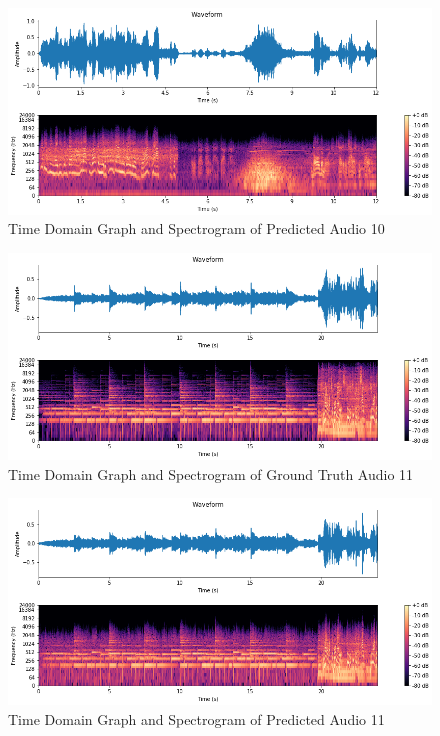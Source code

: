 \documentclass{ioereport}
\begin{document}
    \begin{figure}[H]
        \centering
        \includegraphics[width=\linewidth]{assets/audio_results/12secondspred.png}
        \caption{Time Domain Graph and Spectrogram of Predicted Audio 10}
        \label{fig:pred-12s-spec}
    \end{figure}

    \begin{figure}[H]
        \centering
        \includegraphics[width=\linewidth]{assets/audio_results/24seconds.png}
        \caption{Time Domain Graph and Spectrogram of Ground Truth Audio 11}
        \label{fig:gt-24s-spec}
    \end{figure}
    
    \begin{figure}[H]
        \centering
        \includegraphics[width=\linewidth]{assets/audio_results/24secondspred.png}
        \caption{Time Domain Graph and Spectrogram of Predicted Audio 11}
        \label{fig:pred-24s-spec}
    \end{figure}
    
\end{document}
